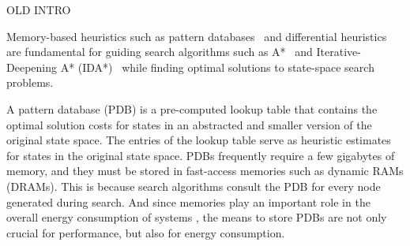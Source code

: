 OLD INTRO

Memory-based heuristics such as pattern databases~\cite{culberson1998patternDatabases,Edelkamp01planningwith} and differential heuristics~\cite{stutervant2009memoryBased} are fundamental for guiding search algorithms such as A*~\cite{hart1968aFormalBasis} and Iterative-Deepening A* (IDA*)~\cite{korf85} while finding optimal solutions to state-space search problems. 

A pattern database (PDB) is a pre-computed lookup table that contains the optimal solution costs for states in an abstracted and smaller version of the original state space. The entries of the lookup table serve as heuristic estimates for states in the original state space. 
PDBs frequently require a few gigabytes of memory, and they must be stored in fast-access memories such as dynamic RAMs (DRAMs). This is because search algorithms consult the PDB for every node generated during search. And since memories play an important role in the overall energy consumption of systems \cite{5695550}, the means to store PDBs are not only crucial for performance, but also for energy consumption. %

